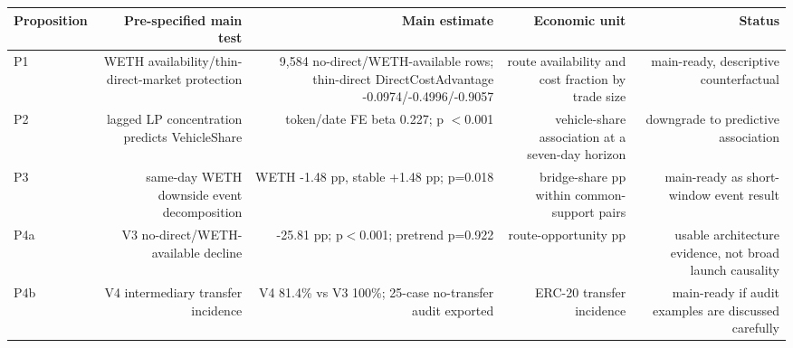 \begin{tabular}{lrrrr}
\toprule
Proposition & Pre-specified main test & Main estimate & Economic unit & Status \\
\midrule
P1 & WETH availability/thin-direct-market protection & 9,584 no-direct/WETH-available rows; thin-direct DirectCostAdvantage -0.0974/-0.4996/-0.9057 & route availability and cost fraction by trade size & main-ready, descriptive counterfactual \\
P2 & lagged LP concentration predicts VehicleShare & token/date FE beta 0.227; p \ensuremath{<}0.001 & vehicle-share association at a seven-day horizon & downgrade to predictive association \\
P3 & same-day WETH downside event decomposition & WETH -1.48 pp, stable +1.48 pp; p=0.018 & bridge-share pp within common-support pairs & main-ready as short-window event result \\
P4a & V3 no-direct/WETH-available decline & -25.81 pp; p\ensuremath{<}0.001; pretrend p=0.922 & route-opportunity pp & usable architecture evidence, not broad launch causality \\
P4b & V4 intermediary transfer incidence & V4 81.4\% vs V3 100\%; 25-case no-transfer audit exported & ERC-20 transfer incidence & main-ready if audit examples are discussed carefully \\
\bottomrule
\end{tabular}

